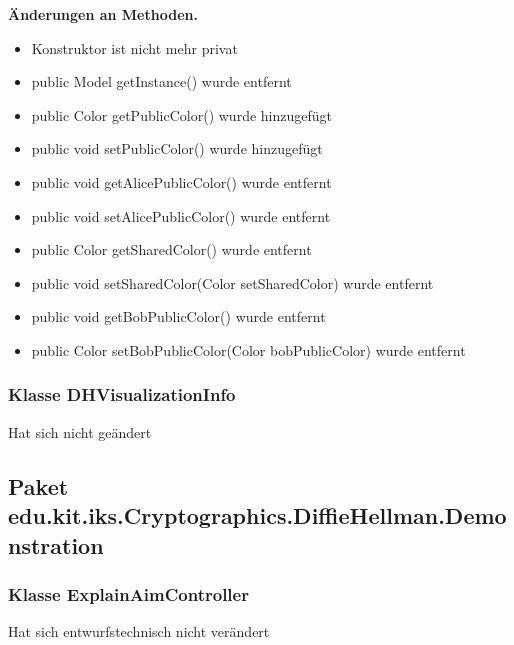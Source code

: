 \documentclass{article}
\begin{document}
    \textbf{Änderungen an Methoden.}\newline
	   \begin{itemize}
           \item Konstruktor ist nicht mehr privat\newline
           \item public Model getInstance() wurde entfernt\newline
           \item public Color getPublicColor() wurde hinzugefügt\newline
           \item public void setPublicColor() wurde hinzugefügt\newline
           \item public void getAlicePublicColor() wurde entfernt\newline
           \item public void setAlicePublicColor() wurde entfernt\newline
           \item public Color getSharedColor() wurde entfernt\newline
           \item public void setSharedColor(Color setSharedColor) wurde entfernt\newline
           \item public void getBobPublicColor() wurde entfernt\newline
           \item public Color setBobPublicColor(Color bobPublicColor) wurde entfernt\newline
           \end{itemize}

	\subsubsection{Klasse DHVisualizationInfo}
    Hat sich nicht geändert

  \subsection{Paket edu.kit.iks.Cryptographics.DiffieHellman.Demonstration}

	\subsubsection{Klasse ExplainAimController}
    Hat sich entwurfstechnisch nicht verändert
\end{document}
